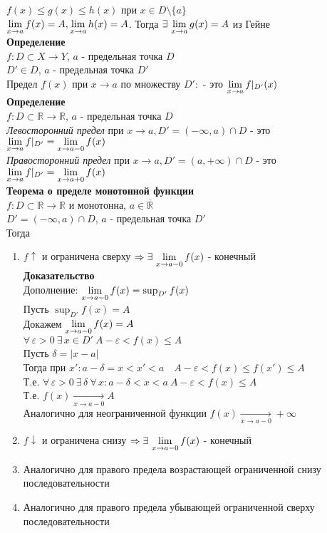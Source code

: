 \documentclass[12pt]{article}
\begin{document}
$f(x) \leq g(x) \leq h(x)$ при $x \in D \setminus\{a\}$\\
$\lim\limits_{x\rightarrow a} f(x) = A, \lim\limits_{x\rightarrow a} h(x) = A$. Тогда $\exists\,\lim\limits_{x\rightarrow a} g(x) = A$ из Гейне\\
\textbf{Определение}\\
$f: D\subset X \rightarrow Y$, $a$ - предельная точка $D$\\
$D'\in D$, $a$ - предельная точка $D'$\\
Предел $f(x)$ при $x\rightarrow a$ по множеству $D':$ - это $\lim\limits_{x\rightarrow a} f|_{D'}(x)$\\
\textbf{Определение}\\
$f:D\subset\mathbb{R} \rightarrow \mathbb{R}$, $a$ - предельная точка $D$\\
\textit{Левосторонний предел} при $x\rightarrow a, D' = (-\infty, a) \cap D$ - это\\
$\lim\limits_{x\rightarrow a} f|_{D'} = \lim\limits_{x\rightarrow a-0} f(x)$\\
\textit{Правосторонний предел} при $x\rightarrow a, D' = (a, +\infty) \cap D$ - это\\
$\lim\limits_{x\rightarrow a} f|_{D'} = \lim\limits_{x\rightarrow a+0} f(x)$\\
\textbf{Теорема о пределе монотонной функции}\\
$f:D\subset \mathbb{R} \rightarrow \mathbb{R}$ и монотонна, $a\in \overline{\mathbb{R}}$\\
$D'=(-\infty,a)\cap D$, $a$ - предельная точка $D'$\\
Тогда
\begin{enumerate}
    \item $f\uparrow$ и ограничена сверху $\Rightarrow\exists\,\lim\limits_{x\rightarrow a-0} f(x)$ - конечный\\
    \textbf{Доказательство}\\
    Дополнение: $\lim\limits_{x\rightarrow a-0}f(x) = \sup_{D'} f(x)$\\
    Пусть $\sup_{D'} f(x) = A$\\
    Докажем $\lim\limits_{x\rightarrow a-0}f(x) = A$\\
    $\forall\, \varepsilon > 0\ \exists\,x\in D'\ A-\varepsilon<f(x)\leq A$\\
    Пусть $\delta = |x-a|$\\
    Тогда при $x':a-\delta =x < x' < a\quad A-\varepsilon < f(x) \leq f(x') \leq A$\\
    Т.е. $\forall\,\varepsilon > 0\ \exists\,\delta\ \forall\,x:a-\delta < x < a\ A-\varepsilon<f(x)\leq A$\\
    Т.е. $f(x) \xrightarrow[x\rightarrow a-0]{} A$\\
    Аналогично для неограниченной функции $f(x) \xrightarrow[x\rightarrow a-0]{} +\infty$
    \item $f\downarrow$ и ограничена снизу $\Rightarrow\exists\,\lim\limits_{x\rightarrow a-0} f(x)$ - конечный
    \item Аналогично для правого предела возрастающей ограниченной снизу последовательности
    \item Аналогично для правого предела убывающей ограниченной сверху последовательности
\end{enumerate}
\end{document}

